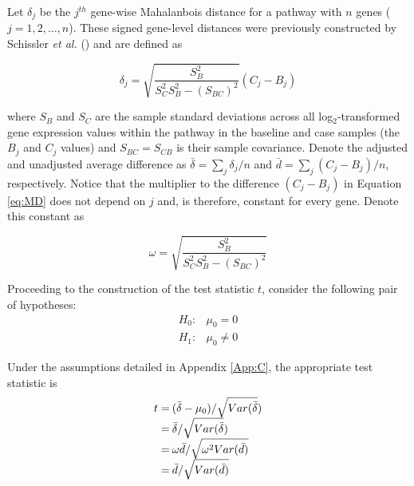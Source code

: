 Let $\delta_{j}$ be the $j^{th}$ gene-wise Mahalanbois distance for a pathway with $n$ genes ($j = 1,2,\ldots,n$). These signed gene-level distances were previously constructed by Schissler \emph{et al.} (\cite{Schissler2015}) and are defined as

\begin{equation}
\label{eq:MD}
\delta_{j} = \sqrt{\frac{S^{2}_{B}}{S^{2}_{C}S^{2}_{B}-(S_{BC})^{2}}}(C_{j} - B_{j}) 
\end{equation}

\noindent where $S_{B}$ and $S_{C}$ are the sample standard deviations across all log$_{2}$-transformed gene expression values within the pathway in the baseline and case samples (the $B_{j}$ and $C_{j}$ values) and $S_{BC}=S_{CB}$ is their sample covariance. Denote the adjusted and unadjusted average difference as $\bar{\delta} = \sum_j \delta_j/n$ and $\bar{d} = \sum_j (C_{j} - B_{j})/n$, respectively. Notice that the multiplier to the difference $(C_{j} - B_{j})$ in Equation \ref{eq:MD} does not depend on $j$ and, is therefore, constant for every gene. Denote this constant as

\begin{equation}
\label{eq:coef}
\omega = \sqrt{\frac{S^{2}_{B}}{S^{2}_{C}S^{2}_{B}-(S_{BC})^{2}}}
\end{equation}

\noindent Proceeding to the construction of the test statistic $t$, consider the following pair of hypotheses:
\begin{equation}
  \label{eq:hypotheses}
\begin{array}{rl}
  H_{0}: & \mu_{0} = 0 \\
  H_{1}: & \mu_{0} \neq 0
\end{array}
\end{equation}

\noindent Under the assumptions detailed in Appendix \ref{App:C}, the appropriate test statistic is
\begin{equation}
  \label{eq:t}
  \arraycolsep=1.1pt\def\arraystretch{1.4}
\begin{array}{rl}
  t = & (\bar{\delta} - \mu_{0})/ \sqrt{Var(\bar{\delta}}) \\
  = & \bar{\delta}/ \sqrt{Var(\bar{\delta}}) \\
  = & \omega \bar{d}/ \sqrt{\omega^{2} Var(\bar{d})} \\
  = & \bar{d}/ \sqrt{ Var(\bar{d})} \\
\end{array}
\end{equation}



